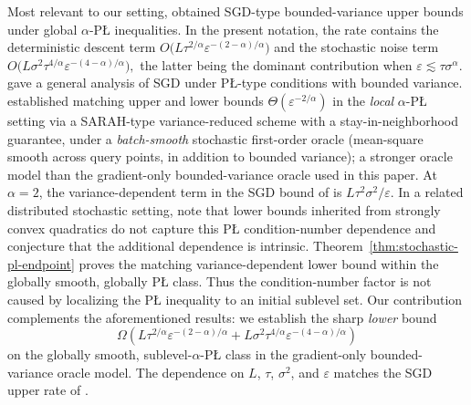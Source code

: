 \documentclass[11pt]{article}
\begin{document}
Most relevant to our setting, \citet{FatkhullinEtesamiHeKiyavash2022} obtained SGD-type bounded-variance upper bounds
under global \(\alpha\)-P\L{} inequalities. In the present notation, the rate contains the deterministic descent term $O\bigl(L\tau^{2/\alpha}\varepsilon^{-(2-\alpha)/\alpha}\bigr)$
and the stochastic noise term $O\bigl(L\sigma^2\tau^{4/\alpha}\varepsilon^{-(4-\alpha)/\alpha}\bigr),$
the latter being the dominant contribution when \(\varepsilon\lesssim\tau\sigma^\alpha\).
\citet{KhaledRichtarik2023} gave a general analysis of SGD under P\L{}-type
conditions with bounded variance. \citet{MasihaSalehkaleybarHeKiyavashThiran2026} established matching upper and
lower bounds $\Theta(\varepsilon^{-2/\alpha})$ in the \emph{local} $\alpha$-P\L{} setting via a SARAH-type variance-reduced scheme with a stay-in-neighborhood guarantee, under a \emph{batch-smooth} stochastic first-order
oracle (mean-square smooth across query points, in addition to bounded variance); a stronger oracle model than the gradient-only bounded-variance oracle used in this paper.
At $\alpha=2$, the variance-dependent term in the SGD bound of
\citet{FatkhullinEtesamiHeKiyavash2022} is $L\tau^2\sigma^2/\varepsilon$. In a related distributed stochastic setting,
\citet{FarhadkhaniEtAl2026} note that lower bounds inherited from strongly convex quadratics do not capture this P\L{}
condition-number dependence and conjecture that the additional dependence is intrinsic.
Theorem~\ref{thm:stochastic-pl-endpoint} proves the matching variance-dependent lower bound within the globally smooth,
globally P\L{} class. Thus the condition-number factor is not caused by localizing the P\L{} inequality to an initial
sublevel set.
Our contribution complements the aforementioned results: we establish the sharp \emph{lower} bound
\[
\Omega\left(
L\tau^{2/\alpha}\varepsilon^{-(2-\alpha)/\alpha}
 + L\sigma^2\tau^{4/\alpha}\varepsilon^{-(4-\alpha)/\alpha}
\right)
\]
on the globally smooth, sublevel-$\alpha$-P\L{} class in the gradient-only bounded-variance oracle model. The
dependence on \(L\), \(\tau\), \(\sigma^2\), and \(\varepsilon\) matches the SGD upper rate of
\citet{FatkhullinEtesamiHeKiyavash2022}.
\end{document}
